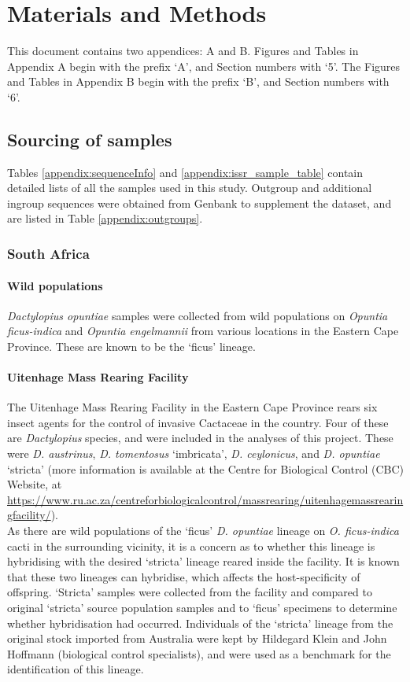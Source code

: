 \chapter{Materials and Methods}
\label{sec:MaterialsAndMethods}
This document contains two appendices: A and B. Figures and Tables in Appendix A begin with the prefix `A', and Section numbers with `5'. 
The Figures and Tables in Appendix B begin with the prefix `B', and Section numbers with `6'. 

\section{Sourcing of samples}

\noindent Tables \ref{appendix:sequenceInfo} and \ref{appendix:issr_sample_table} contain detailed lists of all the samples used in this study. Outgroup and additional ingroup sequences were obtained from Genbank to supplement the dataset, and are listed in Table \ref{appendix:outgroups}.

\subsection{South Africa}

\subsubsection{Wild populations} 
\textit{Dactylopius opuntiae} samples were collected from wild populations on \textit{Opuntia ficus-indica} and \textit{Opuntia engelmannii} from various locations in the Eastern Cape Province. These are known to be the `ficus' lineage. 

\subsubsection{Uitenhage Mass Rearing Facility} 
 The Uitenhage Mass Rearing Facility in the Eastern Cape Province rears six insect agents for the control of invasive Cactaceae in the country. Four of these are \textit{Dactylopius} species, and were included in the analyses of this project. These were \textit{D. austrinus}, \textit{D. tomentosus} `imbricata', \textit{D. ceylonicus}, and \textit{D. opuntiae} `stricta' (more information is available at the Centre for Biological Control (CBC) Website, at \url{https://www.ru.ac.za/centreforbiologicalcontrol/massrearing/uitenhagemassrearingfacility/}). \\
As there are wild populations of the `ficus' \textit{D. opuntiae} lineage on \textit{O. ficus-indica} cacti in the surrounding vicinity, it is a concern as to whether this lineage is hybridising with the desired `stricta' lineage reared inside the facility. It is known that these two lineages can hybridise, which affects the host-specificity of offspring.
`Stricta' samples were collected from the facility and compared to original `stricta' source population samples and to `ficus' specimens to determine whether hybridisation had occurred. Individuals of the `stricta' lineage from the original stock imported from Australia were kept by Hildegard Klein and John Hoffmann (biological control specialists), and were used as a benchmark for the identification of this lineage.

